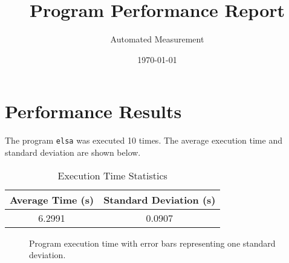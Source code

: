 \documentclass{article}
\title{Program Performance Report}
\author{Automated Measurement}
\date{\today}
\begin{document}
\maketitle

\section{Performance Results}

The program \texttt{elsa} was executed 10 times. The average execution time and standard deviation are shown below.

\begin{table}[h]
\centering
\begin{tabular}{cc}
\toprule
Average Time (s) & Standard Deviation (s) \\
\midrule
6.2991 & 0.0907 \\
\bottomrule
\end{tabular}
\caption{Execution Time Statistics}
\end{table}

\begin{figure}[h]
\centering

\caption{Program execution time with error bars representing one standard deviation.}
\end{figure}
\end{document}
